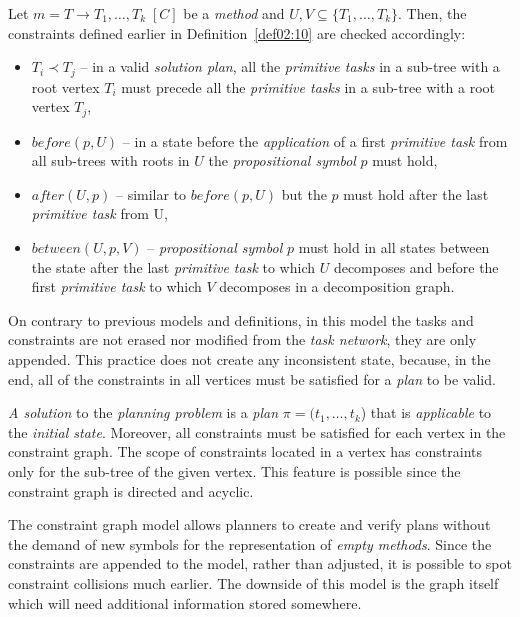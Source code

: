 \medskip\noindent
Let $m = T \rightarrow T_1, \dots, T_k \; [C]$ be a \emph{method} and $U,V \subseteq \{ T_1, \dots, T_k \}$. Then, the constraints defined earlier in Definition~\ref{def02:10} are checked accordingly:

\begin{itemize}
    \item $T_i \prec T_j$ – in a valid \emph{solution plan}, all the \emph{primitive tasks} in a sub-tree with a root vertex $T_i$ must precede all the \emph{primitive tasks} in a sub-tree with a root vertex $T_j$,

    \item $before(p, U)$ – in a state before the \emph{application} of a first \emph{primitive task} from all sub-trees with roots in $U$ the \emph{propositional symbol} $p$ must hold,

    \item $after(U, p)$ – similar to $before(p, U)$ but the $p$ must hold after the last \emph{primitive task} from U,

    \item $between(U, p, V)$ – \emph{propositional symbol} $p$ must hold in all states between the state after the last \emph{primitive task} to which $U$ decomposes and before the first \emph{primitive task} to which $V$ decomposes in a decomposition graph.
\end{itemize}

\medskip\noindent
On contrary to previous models and definitions, in this model the tasks and constraints are not erased nor modified from the \emph{task network}, they are only appended. This practice does not create any inconsistent state, because, in the end, all of the constraints in all vertices must be satisfied for a \emph{plan} to be valid. 

\medskip\noindent
\emph{A solution} to the \emph{planning problem} is a \emph{plan} $\pi = (t_1, \dots, t_k$) that is \emph{applicable} to the \emph{initial state}. Moreover, all constraints must be satisfied for each vertex in the constraint graph. The scope of constraints located in a vertex has constraints only for the sub-tree of the given vertex. This feature is possible since the constraint graph is directed and acyclic.

\medskip\noindent
The constraint graph model allows planners to create and verify plans without the demand of new symbols for the representation of \emph{empty methods}. Since the constraints are appended to the model, rather than adjusted, it is possible to spot constraint collisions much earlier. The downside of this model is the graph itself which will need additional information stored somewhere.

